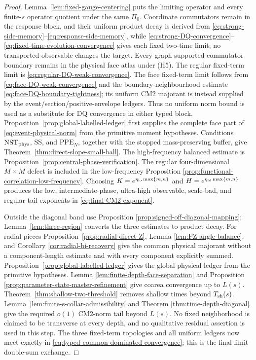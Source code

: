 \documentclass[11pt]{article}
\begin{document}
\begin{proof}
Lemma~\ref{lem:fixed-gauge-centering} puts the limiting operator and every
finite-$s$ operator quotient under the same $\Pi_0$.  Coordinate
commutators remain in the response block, and their uniform product decay is
derived from \eqref{eq:strong-side-memory}--\eqref{eq:response-side-memory},
while \eqref{eq:strong-DQ-convergence}--
\eqref{eq:fixed-time-evolution-convergence} gives each fixed two-time limit; no
transported observable changes the target.  Every graph-supported
commutator boundary remains in the physical face atlas under \textup{(H5)}.
The regular fixed-term limit is
\eqref{eq:regular-DQ-weak-convergence}.  The face fixed-term limit follows
from \eqref{eq:face-DQ-weak-convergence} and the boundary-neighbourhood
estimate \eqref{eq:face-DQ-boundary-tightness}; its uniform CM2 majorant is
instead supplied by the event/section/positive-envelope ledgers.  Thus no
uniform norm bound is used as a substitute for DQ convergence in either
typed block.
Proposition~\ref{prop:global-labelled-ledger} first supplies the complete face
part of \eqref{eq:event-physical-norm} from the primitive moment hypotheses.
Conditions $\mathrm{NST}_{\rm phys}$, $\mathrm{SS}$, and
$\mathrm{PPE}_{N}$, together with the stopped mass-preserving buffer, give
Theorem~\ref{thm:direct-slope-small-ball}.  The high-frequency balanced
estimate is Proposition~\ref{prop:central-phase-verification}.  The regular
four-dimensional $M\times M$ defect is included in the low-frequency Proposition
\ref{prop:functional-correlation-low-frequency}.  Choosing
$K=e^{\eta_{\rm lo}\max\{m,n\}}$ and
$H=e^{\eta_{\rm hi}\max\{m,n\}}$ produces the low, intermediate-phase,
ultra-high observable, scale-bad, and regular-tail exponents in
\eqref{eq:final-CM2-exponent}.

Outside the diagonal band use Proposition
\ref{prop:signed-off-diagonal-mapping};
Lemma~\ref{lem:three-region} converts the three estimates to product decay.
For radial pieces Proposition~\ref{prop:radial-direct-Z}, Lemma
\ref{lem:FZ-angle-balance}, and Corollary
\ref{cor:radial-bi-recovery} give the common physical majorant without a
component-length estimate and with every component explicitly summed.
Proposition~\ref{prop:global-labelled-ledger} gives the global physical
ledger from the primitive hypotheses.  Lemma
\ref{lem:finite-depth-face-separation} and Proposition
\ref{prop:parameter-state-master-refinement} give coarea convergence up to
$L(s)$.  Theorem~\ref{thm:shallow-two-threshold} removes shallow times beyond
$T_{\rm sh}(s)$.  Lemma~\ref{lem:finite-s-collar-admissibility} and Theorem
\ref{thm:time-depth-diagonal} give the required $o(1)$ CM2-norm tail beyond
$L(s)$.  No fixed neighborhood is
claimed to be transverse at every depth, and no qualitative residual
assertion is used in this step.  The three fixed-term topologies and all
uniform ledgers now meet exactly in
\eqref{eq:typed-common-dominated-convergence}; this is the final
limit--double-sum exchange.
\end{proof}
\end{document}
